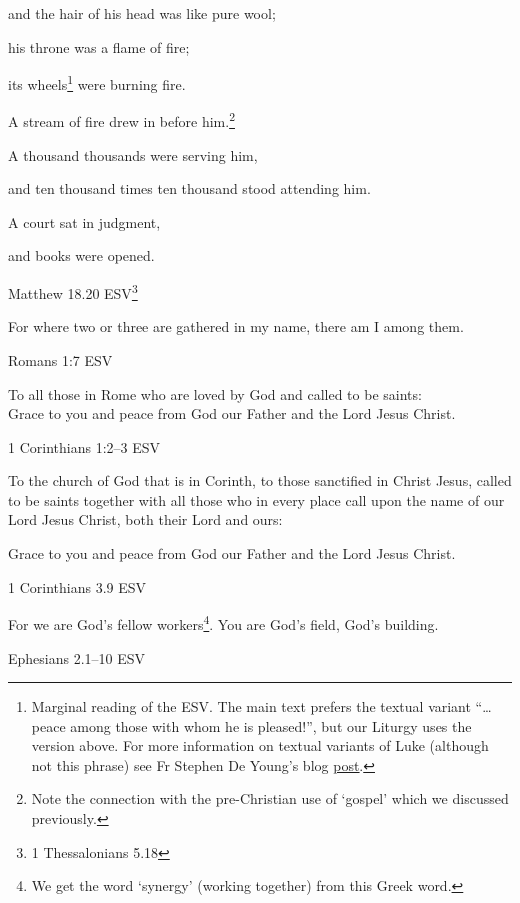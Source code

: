 \documentclass[
]{article}
\newcommand{\RL}[1]{\beginR #1\endR}
\begin{document}
and the hair of his head was like pure wool;

his throne was a flame of fire;

its wheels\footnote{Marginal reading of the ESV. The main text prefers
  the textual variant ``\ldots peace among those with whom he is
  pleased!'', but our Liturgy uses the version above. For more
  information on textual variants of Luke (although not this phrase) see
  Fr Stephen De Young's blog
  \href{https://blogs.ancientfaith.com/wholecounsel/2021/03/31/the-two-lukes/}{\ul{post}}.}
were burning fire.

A stream of fire drew in before him.\footnote{Note the connection with
  the pre-Christian use of `gospel' which we discussed previously.}

A thousand thousands were serving him,

and ten thousand times ten thousand stood attending him.

A court sat in judgment,

and books were opened.

Matthew 18.20 ESV\footnote{1 Thessalonians 5.18}

For where two or three are gathered in my name, there am I among them.

Romans 1:7 ESV

To all those in Rome who are loved by God and called to be saints:\\
Grace to you and peace from God our Father and the Lord Jesus Christ.

1 Corinthians 1:2--3 ESV

To the church of God that is in Corinth, to those sanctified in Christ
Jesus, called to be saints together with all those who in every place
call upon the name of our Lord Jesus Christ, both their Lord and ours:

Grace to you and peace from God our Father and the Lord Jesus Christ.

1 Corinthians 3.9 ESV

For we are God\RL{'}s fellow workers\footnote{We get the word `synergy'
  (working together) from this Greek word.}. You are God\RL{'}s field,
God\RL{'}s building.

Ephesians 2.1--10 ESV
\end{document}
